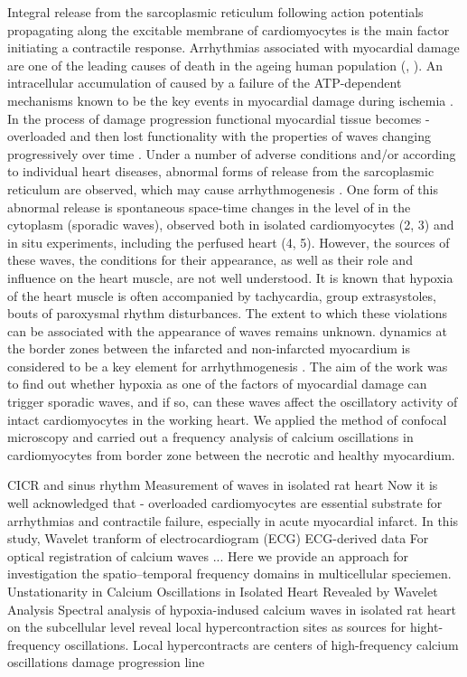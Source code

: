 \documentclass{biophys-new}
\begin{document}
Integral  release from the sarcoplasmic reticulum following action potentials propagating along the excitable membrane of cardiomyocytes is the main factor initiating a contractile response.
Arrhythmias associated with myocardial damage are one of the leading causes of death in the ageing human population (\cite{xiao2011cardiac}, \cite{}).
An intracellular accumulation of  caused by a failure of the ATP-dependent mechanisms known to be the key events in myocardial damage during ischemia \cite{shen1972myocardial,shen1972kinetics,nayler1981role}.
In the process of damage progression functional myocardial tissue becomes -overloaded and then lost functionality with the properties of  waves changing progressively over time \cite{minamikawa1997situ,hama1998real}.
Under a number of adverse conditions and/or according to individual heart diseases, abnormal forms of  release from the sarcoplasmic reticulum are observed, which may cause arrhythmogenesis \cite{ishide1990propagation}.
One form of this abnormal release is spontaneous space-time changes in the level of  in the cytoplasm (sporadic  waves), observed both in isolated cardiomyocytes (2, 3) and in situ experiments, including the perfused heart (4, 5).
However, the sources of these waves, the conditions for their appearance, as well as their role and influence on the heart muscle, are not well understood.
It is known that hypoxia of the heart muscle is often accompanied by tachycardia, group extrasystoles, bouts of paroxysmal rhythm disturbances.
The extent to which these violations can be associated with the appearance of  waves remains unknown.
 dynamics at the border zones between the infarcted and non-infarcted myocardium is considered to be a key element for arrhythmogenesis \cite{takamatsu2008arrhythmogenic}.
The aim of the work was to find out whether hypoxia as one of the factors of myocardial damage can trigger sporadic  waves, and if so, can these waves affect the oscillatory activity of intact cardiomyocytes in the working heart.
We applied the method of confocal microscopy and carried out a frequency analysis of calcium oscillations in cardiomyocytes from border zone between the necrotic and healthy myocardium.


CICR and sinus rhythm
Measurement of  waves in isolated rat heart
Now it is well acknowledged that  - overloaded cardiomyocytes are essential substrate for arrhythmias and contractile failure, especially in acute myocardial infarct.
In this study,
Wavelet tranform of electrocardiogram (ECG) ECG-derived data \cite{sharma2017use}
For optical registration of calcium waves \cite{matsuura2018intravital} ...
Here we provide an approach for investigation the spatio–temporal frequency domains in multicellular speciemen.
Unstationarity in Calcium Oscillations in Isolated Heart Revealed by Wavelet Analysis
Spectral analysis of hypoxia-indused calcium waves in isolated rat heart on the subcellular level reveal local hypercontraction sites as sources for hight-frequency oscillations.
Local hypercontracts are centers of high-frequency calcium oscillations
damage progression line
\end{document}
